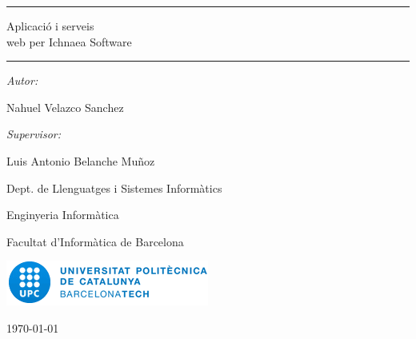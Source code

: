 \begin{titlepage}

\begin{center}
\vspace{4 cm}

\hrule
\vspace{4 mm}
\huge{Aplicació i serveis \\
web per Ichnaea Software}
\vspace{4 mm}
\hrule

\vspace{2 cm}

\large{\emph{Autor:}}

\large{Nahuel Velazco Sanchez} \\

\vspace{1 cm}

\large{\emph{Supervisor:}}

\large{Luis Antonio Belanche Muñoz} \\

\vspace{1 cm}

\large{Dept. de Llenguatges i Sistemes Inform\`{a}tics} \\

\vspace{4 cm}

\large{Enginyeria Inform\`{a}tica} 

\large{Facultat d'Inform\`{a}tica de Barcelona} 

\vspace{1.5 cm}

\includegraphics[scale=0.5]{upc}

\vfill

\large{\today}

\end{center}

\end{titlepage}
